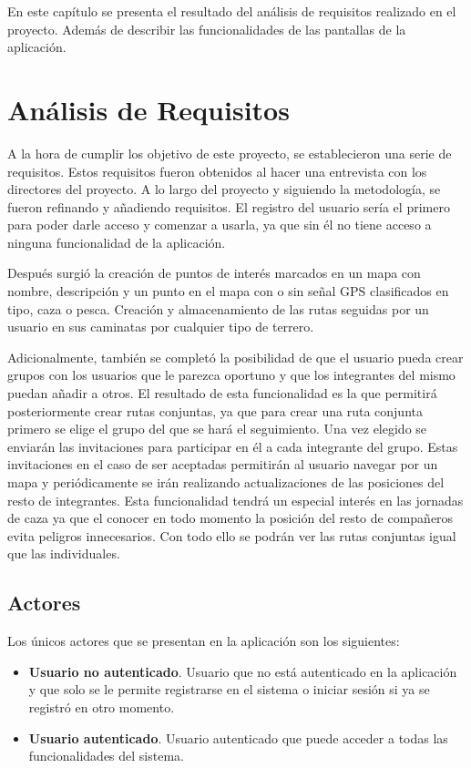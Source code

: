 
En este capítulo se presenta el resultado del análisis de requisitos realizado en el proyecto. Además de describir las funcionalidades de las pantallas de la aplicación.
\section{Análisis de Requisitos}


A la hora de cumplir los objetivo de este proyecto, se establecieron una serie de requisitos. Estos requisitos fueron obtenidos al  hacer una entrevista con los directores del proyecto. A lo largo del proyecto y siguiendo la metodología, se fueron refinando y añadiendo requisitos. 
El registro del usuario sería el primero para poder darle acceso y comenzar a usarla, ya que sin él no tiene acceso a ninguna funcionalidad de la aplicación.

Después surgió la creación de puntos de interés marcados en un mapa con nombre, descripción y un punto en el mapa con o sin señal GPS clasificados en tipo, caza o pesca.
Creación y almacenamiento de las rutas seguidas por un usuario en sus caminatas por cualquier tipo de terrero.

Adicionalmente, también se completó la posibilidad de que el usuario pueda crear grupos con los usuarios que le parezca oportuno y que los integrantes del mismo puedan añadir a otros. El resultado de esta funcionalidad es la que permitirá posteriormente crear rutas conjuntas, ya que para crear una ruta conjunta primero se elige el grupo del que se hará el seguimiento. Una vez elegido se enviarán las invitaciones para participar en él a cada integrante del grupo. Estas invitaciones en el caso de ser aceptadas permitirán al usuario navegar por un mapa y periódicamente se irán realizando actualizaciones de las posiciones del resto de integrantes. Esta funcionalidad tendrá un especial interés en las jornadas de caza ya que el conocer en todo momento la posición del resto de compañeros evita peligros innecesarios. Con todo ello se podrán ver las rutas conjuntas igual que las individuales.
\subsection{Actores}

Los únicos actores que se presentan en la  aplicación son los siguientes:
\begin{itemize}
\item \textbf{Usuario no  autenticado}. Usuario que no está autenticado en la aplicación y que solo
se le permite registrarse en el  sistema o iniciar sesión si ya se registró en otro momento.
\item \textbf{Usuario  autenticado}. Usuario autenticado que puede acceder a todas las funcionalidades
del sistema.
\end{itemize}




